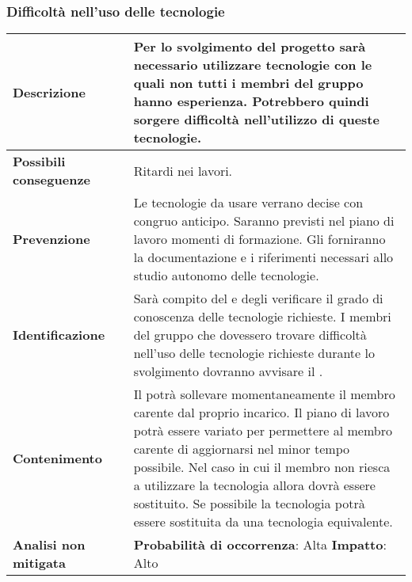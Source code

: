 	\newpage
		\subsubsection {Difficoltà nell'uso delle tecnologie}
		\label{subsec:difficoltaTecnol}
		
		
					\small
					\begin{table}[H]
					\begin{center}			
					\begin{tabular}{p{2.5cm}p{0.5cm}p{11cm}}
					\arrayrulecolor{lightgray}
					
					\toprule				
						\textbf{Descrizione}
						& &
						Per lo svolgimento del progetto sarà necessario utilizzare tecnologie con le quali non tutti i membri del gruppo hanno esperienza. Potrebbero quindi sorgere difficoltà nell'utilizzo di queste tecnologie.
					\\
					\midrule
						\textbf{Possibili \newline conseguenze}
						& &
						Ritardi nei lavori.
					\\
					\midrule
						\textbf{Prevenzione}
						& &
						Le tecnologie da usare verrano decise con congruo anticipo. Saranno previsti nel piano di lavoro momenti di formazione. Gli \amministratori{} forniranno la documentazione e i riferimenti necessari allo studio autonomo delle tecnologie.
					\\
					\midrule
						\textbf{Identificazione}
						& &
						Sarà compito del \responsabilediprogetto{} e degli \amministratori{} verificare il grado di conoscenza delle tecnologie richieste. I membri del gruppo che dovessero trovare difficoltà nell'uso delle tecnologie richieste durante lo svolgimento dovranno avvisare il \responsabilediprogetto.
					\\
					\midrule
						\textbf{Contenimento}
						& &
						Il \responsabilediprogetto{} potrà sollevare momentaneamente il membro carente dal proprio incarico. Il piano di lavoro potrà essere variato per permettere al membro carente di aggiornarsi nel minor tempo possibile. Nel caso in cui il membro non riesca a utilizzare la tecnologia allora dovrà essere sostituito. Se possibile la tecnologia potrà essere sostituita da una tecnologia equivalente.
					\\
					\midrule
						\textbf{Analisi \newline non mitigata}
						& &
						\textbf{Probabilità di occorrenza}: Alta
						\newline
						\textbf{Impatto}: Alto
					\\

\end{tabular}
\end{center}
\end{table}

